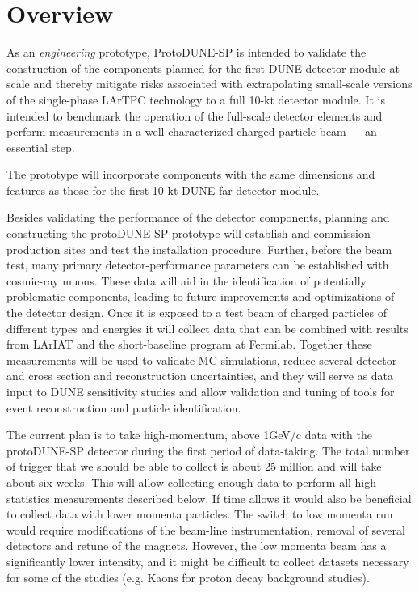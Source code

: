 
\section{Overview}

As an \textit{engineering} prototype, ProtoDUNE-SP is
intended to validate the construction of the components planned for the
first DUNE  detector module at scale and thereby mitigate
risks associated with extrapolating small-scale versions of the
single-phase LArTPC technology to a full 10-kt detector module.  It is
intended to benchmark the operation of the full-scale detector
elements and perform measurements in a well characterized
charged-particle beam --- an essential step.

The prototype will incorporate components with the same
dimensions and features as those for the first 10-kt DUNE far detector
module.

Besides validating the performance of the detector components,
planning and constructing the protoDUNE-SP prototype will establish and
commission production sites and test the installation procedure.
Further, before the beam test, many primary detector-performance parameters can be established with cosmic-ray muons.  These data will aid in the identification of potentially problematic components, leading to future improvements and optimizations of the detector design.  Once
it is exposed to a test beam of charged particles of different types
and energies it will collect data that can be combined with results from LArIAT and the short-baseline program at Fermilab.  Together
these measurements will be used to validate MC simulations, reduce several detector and cross section and reconstruction uncertainties, and they
will serve as data input to DUNE sensitivity studies and allow
validation and tuning of tools for event reconstruction and particle
identification.

The current plan is to take high-momentum, above 1GeV/c  data with the protoDUNE-SP detector during the first period of data-taking. The total number of trigger that we should be able to collect is about 25 million and will take about six weeks. This will allow collecting enough data to perform all high statistics measurements described below.  If time allows it would also be beneficial to collect data with lower momenta particles. The switch to low momenta run would require modifications of the beam-line instrumentation, removal of several detectors and retune of the magnets. However, the low momenta beam has a significantly lower intensity, and it might be difficult to collect datasets necessary for some of the studies (e.g. Kaons for proton decay background studies).

